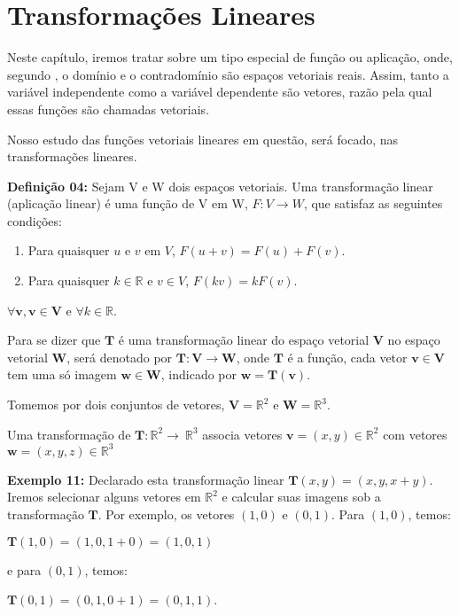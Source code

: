 \chapter{Transformações Lineares}
Neste capítulo, iremos tratar sobre um tipo especial de função ou aplicação, onde, segundo \cite{steinbruch1987}, o domínio e o contradomínio são espaços vetoriais reais. Assim, tanto a variável independente como a variável dependente são vetores, razão pela qual essas funções são chamadas vetoriais.

Nosso estudo das funções vetoriais lineares em questão, será focado, nas transformações lineares.

\noindent\textbf{Definição 04:} Sejam V e W dois espaços vetoriais. Uma transformação linear (aplicação linear) é uma função de V em W, $F:V \rightarrow W$, que satisfaz as seguintes condições:
\begin{enumerate}
	\item Para quaisquer $u$ e $v$ em $V$, $F(u + v) = F(u) + F(v)$.
	\item Para quaisquer $k \in \mathbb{R}$ e $v \in V$, $F(kv) = kF(v)$.
\end{enumerate}	
\noindent\centerline{$\forall\mathbf{v}, \mathbf{v} \in \mathbf{V}$ e $\forall k \in \mathbb{R}$.}
Para se dizer que $\mathbf{T}$ é uma transformação linear do espaço vetorial $\mathbf{V}$ no espaço vetorial $\mathbf{W}$, será denotado por $\mathbf{T}:\mathbf{V}\longrightarrow\mathbf{W}$, onde $\mathbf{T}$ é a função, cada vetor $\mathbf{v} \in \mathbf{V}$ tem uma só imagem $\mathbf{w} \in \mathbf{W}$, indicado por $\mathbf{w} = \mathbf{T}(\mathbf{v})$.

Tomemos por dois conjuntos de vetores, $\mathbf{V} = \mathbb{R}^2$ e $\mathbf{W} = \mathbb{R}^3$.

Uma transformação de $\mathbf{T}:\mathbb{R}^2\longrightarrow\ \mathbb{R}^3$ associa vetores $\mathbf{v} = (x, y) \in \mathbb{R}^2$ com vetores $\mathbf{w} = (x, y, z) \in \mathbb{R}^3$

\noindent\textbf{Exemplo 11:} Declarado esta transformação linear $\mathbf{T}(x, y) = (x, y, x + y)$. Iremos selecionar alguns vetores em $\mathbb{R}^2$ e calcular suas imagens sob a transformação $\mathbf{T}$. Por exemplo, os vetores $(1, 0)$ e $(0, 1)$. Para $(1, 0)$, temos: 

\centerline{$\mathbf{T}(1, 0) = (1, 0, 1 +0) = (1, 0, 1)$}

\noindent e para $(0, 1)$, temos:

\centerline{$\mathbf{T}(0, 1) = (0, 1, 0 + 1) = (0, 1, 1)$.}

